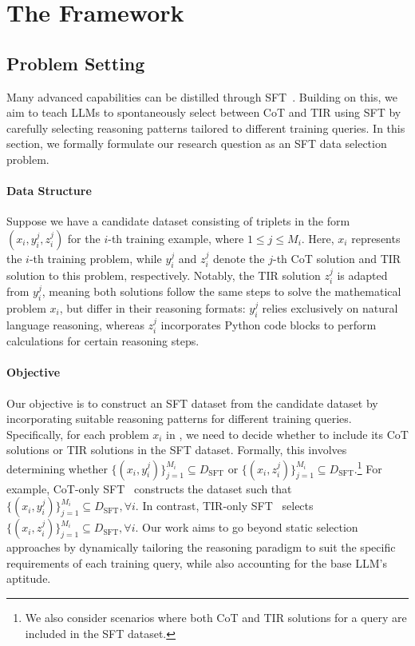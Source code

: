 \section{The {\method} Framework}\label{sec:method}
\subsection{Problem Setting}\label{sec:problem_setting}

Many advanced capabilities can be distilled through SFT~\citep{s12025muennighoff, lima2024zhou, deepseekr12025deepseekai}. 
Building on this, we aim to teach LLMs to spontaneously select between CoT and TIR using SFT by carefully selecting reasoning patterns tailored to different training queries.
In this section, we formally formulate our research question as an SFT data selection problem.

\paragraph{Data Structure}
Suppose we have a candidate dataset {\dde} consisting of triplets in the form $(x_i, y_i^j, z_i^j)$ for the $i$-th training example, where $1 \leq j \leq M_i$. 
Here, $x_i$ represents the $i$-th training problem, while $y_i^j$ and $z_i^j$ denote the $j$-th CoT solution and TIR solution to this problem, respectively.
Notably, the TIR solution $z_i^j$ is adapted from $y_i^j$, meaning both solutions follow the same steps to solve the mathematical problem $x_i$, but differ in their reasoning formats: $y_i^j$ relies exclusively on natural language reasoning, whereas $z_i^j$ incorporates Python code blocks to perform calculations for certain reasoning steps.

\paragraph{Objective}
Our objective is to construct an SFT dataset from the candidate dataset {\dde} by incorporating suitable reasoning patterns for different training queries.
Specifically, for each problem $x_i$ in {\dde}, we need to decide whether to include its CoT solutions or TIR solutions in the SFT dataset. 
Formally, this involves determining whether $\{(x_i, y_i^j)\}_{j=1}^{M_i} \subseteq D_{\text{SFT}}$ or $\{(x_i, z_i^j)\}_{j=1}^{M_i} \subseteq D_{\text{SFT}}$.\footnote{We also consider scenarios where both CoT and TIR solutions for a query are included in the SFT dataset.}
For example, CoT-only SFT~\citep{E-GSM2024Xu} constructs the dataset such that $\{(x_i, y_i^j)\}_{j=1}^{M_i} \subseteq D_{\text{SFT}}, \forall i$. 
In contrast, TIR-only SFT~\citep{tora2023Gou} selects $\{(x_i, z_i^j)\}_{j=1}^{M_i} \subseteq D_{\text{SFT}}, \forall i$. 
Our work aims to go beyond static selection approaches by dynamically tailoring the reasoning paradigm to suit the specific requirements of each training query, while also accounting for the base LLM's aptitude.

